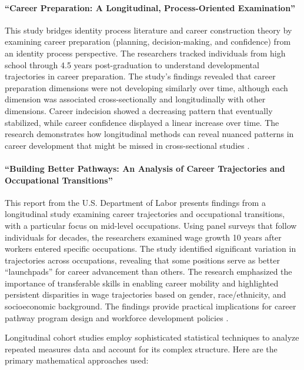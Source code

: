 \documentclass[../main.tex]{subfiles}
\begin{document}
\paragraph{``Career Preparation: A Longitudinal, Process-Oriented Examination''}
This study bridges identity process literature and career construction theory by examining career preparation (planning, decision-making, and confidence) from an identity process perspective. The researchers tracked individuals from high school through 4.5 years post-graduation to understand developmental trajectories in career preparation. The study's findings revealed that career preparation dimensions were not developing similarly over time, although each dimension was associated cross-sectionally and longitudinally with other dimensions. Career indecision showed a decreasing pattern that eventually stabilized, while career confidence displayed a linear increase over time. The research demonstrates how longitudinal methods can reveal nuanced patterns in career development that might be missed in cross-sectional studies \cite{porfeli2011career}.

\paragraph{``Building Better Pathways: An Analysis of Career Trajectories and Occupational Transitions''}
This report from the U.S. Department of Labor presents findings from a longitudinal study examining career trajectories and occupational transitions, with a particular focus on mid-level occupations. Using panel surveys that follow individuals for decades, the researchers examined wage growth 10 years after workers entered specific occupations. The study identified significant variation in trajectories across occupations, revealing that some positions serve as better ``launchpads'' for career advancement than others. The research emphasized the importance of transferable skills in enabling career mobility and highlighted persistent disparities in wage trajectories based on gender, race/ethnicity, and socioeconomic background. The findings provide practical implications for career pathway program design and workforce development policies \cite{dol2021pathways}.


Longitudinal cohort studies employ sophisticated statistical techniques to analyze repeated measures data and account for its complex structure. Here are the primary mathematical approaches used:
\end{document}
